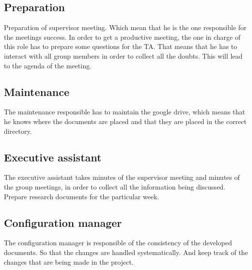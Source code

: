 \subsection*{Preparation}
Preparation of supervisor meeting. Which mean that he is the one responsible for the meetings success. In order to get a productive meeting, the one in charge of this role has to prepare some questions for the TA. That means that he has to interact with all group members in order to collect all the doubts. This will lead to the agenda of the meeting.


\subsection*{Maintenance}
The maintenance responsible has to maintain the google drive, which means that he knows where the documents are placed and that they are placed in the correct directory.


\subsection*{Executive assistant}
The executive assistant takes minutes of the supervisor meeting and minutes of the group meetings, in order to collect all the information being discussed.
Prepare research documents for the particular week.


\subsection*{Configuration manager}
The configuration manager is responsible of the consistency of the developed documents. So that the changes are handled systematically. And keep track of the changes that are being made in the project.